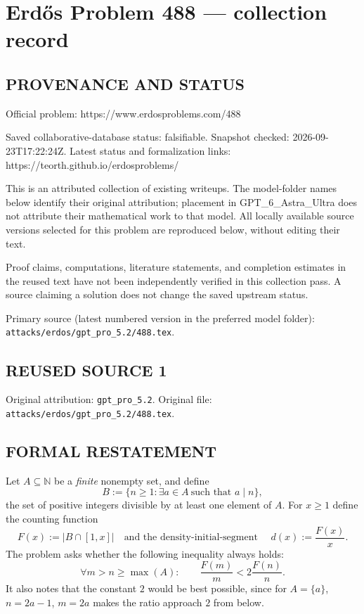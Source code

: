 \section*{Erd\H{o}s Problem 488 --- collection record}

\subsection*{PROVENANCE AND STATUS}
Official problem: https://www.erdosproblems.com/488

Saved collaborative-database status: falsifiable.
Snapshot checked: 2026-09-23T17:22:24Z.
Latest status and formalization links: https://teorth.github.io/erdosproblems/

This is an attributed collection of existing writeups. The model-folder names below identify their original attribution; placement in GPT\_6\_Astra\_Ultra does not attribute their mathematical work to that model. All locally available source versions selected for this problem are reproduced below, without editing their text.

Proof claims, computations, literature statements, and completion estimates in the reused text have not been independently verified in this collection pass. A source claiming a solution does not change the saved upstream status.

Primary source (latest numbered version in the preferred model folder): \texttt{attacks/erdos/gpt\_pro\_5.2/488.tex}.

\subsection*{REUSED SOURCE 1}
Original attribution: \texttt{gpt\_pro\_5.2}.
Original file: \texttt{attacks/erdos/gpt\_pro\_5.2/488.tex}.


\subsection*{FORMAL RESTATEMENT}
Let $A\subseteq\mathbb{N}$ be a \emph{finite} nonempty set, and define
\[
B := \{ n\ge 1 : \exists a\in A\ \text{such that } a\mid n\},
\]
the set of positive integers divisible by at least one element of $A$.
For $x\ge 1$ define the counting function
\[F(x):=|B\cap[1,x]|\quad\text{and the density-initial-segment }\quad d(x):=\frac{F(x)}{x}.
\]
The problem asks whether the following inequality always holds:
\[
\forall m>n\ge \max(A):\qquad \frac{F(m)}{m} < 2\frac{F(n)}{n}.
\]
It also notes that the constant $2$ would be best possible, since for $A=\{a\}$, $n=2a-1$, $m=2a$ makes the ratio approach $2$ from below.

